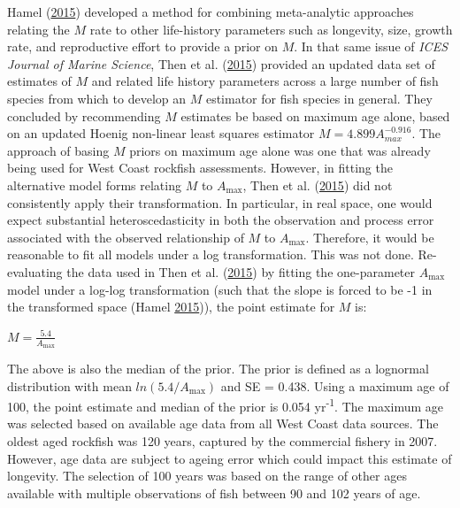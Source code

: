 \documentclass[12pt,]{article}
\begin{document}
Hamel (\protect\hyperlink{ref-hamel_method_2015}{2015}) developed a
method for combining meta-analytic approaches relating the \(M\) rate to
other life-history parameters such as longevity, size, growth rate, and
reproductive effort to provide a prior on \(M\). In that same issue of
\emph{ICES Journal of Marine Science}, Then et al.
(\protect\hyperlink{ref-then_evaluating_2015}{2015}) provided an updated
data set of estimates of \(M\) and related life history parameters
across a large number of fish species from which to develop an \(M\)
estimator for fish species in general. They concluded by recommending
\(M\) estimates be based on maximum age alone, based on an updated
Hoenig non-linear least squares estimator \(M=4.899A^{-0.916}_{max}\).
The approach of basing \(M\) priors on maximum age alone was one that
was already being used for West Coast rockfish assessments. However, in
fitting the alternative model forms relating \(M\) to
\(A_{\text{max}}\), Then et al.
(\protect\hyperlink{ref-then_evaluating_2015}{2015}) did not
consistently apply their transformation. In particular, in real space,
one would expect substantial heteroscedasticity in both the observation
and process error associated with the observed relationship of \(M\) to
\(A_{\text{max}}\). Therefore, it would be reasonable to fit all models
under a log transformation. This was not done. Re-evaluating the data
used in Then et al. (\protect\hyperlink{ref-then_evaluating_2015}{2015})
by fitting the one-parameter \(A_{\text{max}}\) model under a log-log
transformation (such that the slope is forced to be -1 in the
transformed space (Hamel
\protect\hyperlink{ref-hamel_method_2015}{2015})), the point estimate
for \(M\) is:

\begin{centering}

$M=\frac{5.4}{A_{\text{max}}}$

\end{centering}

The above is also the median of the prior. The prior is defined as a
lognormal distribution with mean \(ln(5.4/A_{\text{max}})\) and SE =
0.438. Using a maximum age of 100, the point estimate and median of the
prior is 0.054 yr\textsuperscript{-1}. The maximum age was selected
based on available age data from all West Coast data sources. The oldest
aged rockfish was 120 years, captured by the commercial fishery in 2007.
However, age data are subject to ageing error which could impact this
estimate of longevity. The selection of 100 years was based on the range
of other ages available with multiple observations of fish between 90
and 102 years of age.
\end{document}
